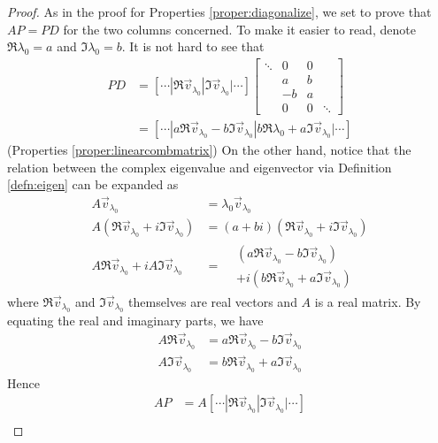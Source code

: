 \begin{proof}
As in the proof for Properties \ref{proper:diagonalize}, we set to prove that $AP = PD$ for the two columns concerned. To make it easier to read, denote $\Re{\lambda_0} = a$ and $\Im{\lambda_0} = b$. It is not hard to see that
\begin{align*}
PD &=
[\cdots|\Re{\vec{v}_{\lambda_0}}|\Im{\vec{v}_{\lambda_0}}|\cdots]
\begin{bmatrix}
\ddots & 0 & 0 & \\
& a & b & \\
& -b & a & \\
& 0 & 0 & \ddots
\end{bmatrix} \\
&= [\cdots|a\Re{\vec{v}_{\lambda_0}} - b\Im{\vec{v}_{\lambda_0}} | b\Re{\lambda_0} + a\Im{\vec{v}_{\lambda_0}}|\cdots]
\end{align*}
(Properties \ref{proper:linearcombmatrix}) On the other hand, notice that the relation between the complex eigenvalue and eigenvector via Definition \ref{defn:eigen} can be expanded as
\begin{align*}
A\vec{v}_{\lambda_0} &= \lambda_0\vec{v}_{\lambda_0} \\
A(\Re{\vec{v}_{\lambda_0}} + i \Im{\vec{v}_{\lambda_0}}) &= (a+bi)(\Re{\vec{v}_{\lambda_0}} + i \Im{\vec{v}_{\lambda_0}}) \\
A\Re{\vec{v}_{\lambda_0}} + i A\Im{\vec{v}_{\lambda_0}} &= \begin{aligned}
& (a\Re{\vec{v}_{\lambda_0}} - b\Im{\vec{v}_{\lambda_0}}) \\
& +i(b\Re{\vec{v}_{\lambda_0}} + a\Im{\vec{v}_{\lambda_0}})    
\end{aligned}
\end{align*}
where $\Re{\vec{v}_{\lambda_0}}$ and $\Im{\vec{v}_{\lambda_0}}$ themselves are real vectors and $A$ is a real matrix. By equating the real and imaginary parts, we have
\begin{subequations}
\begin{align}
A\Re{\vec{v}_{\lambda_0}} &= a\Re{\vec{v}_{\lambda_0}} - b\Im{\vec{v}_{\lambda_0}} \label{eqn:realmodiag} \\
A\Im{\vec{v}_{\lambda_0}} &= b\Re{\vec{v}_{\lambda_0}} + a\Im{\vec{v}_{\lambda_0}}
\label{eqn:imgmodiag}
\end{align}
\end{subequations}
Hence
\begin{align*}
AP &= A[\cdots|\Re{\vec{v}_{\lambda_0}}|\Im{\vec{v}_{\lambda_0}}|\cdots] \\

\end{align*}
\end{proof}
